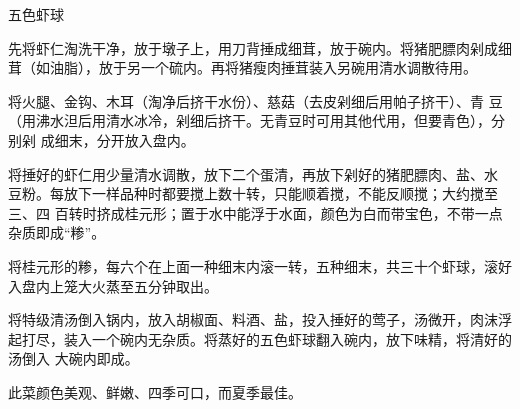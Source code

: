 \begin{recipe}{五色虾球}

\ingredients


\preparation

\step 先将虾仁淘洗干净，放于墩子上，用刀背捶成细茸，放于碗内。将猪肥膘肉剁成细
茸（如油脂），放于另一个硫内。再将猪瘦肉捶茸装入另碗用清水调散待用。

\step 将火腿、金钩、木耳（淘净后挤干水份）、慈菇（去皮剁细后用帕子挤干）、青
豆（用沸水泹后用清水冰冷，剁细后挤干。无青豆时可用其他代用，但要青色），分别剁
成细末，分开放入盘内。

\step 将捶好的虾仁用少量清水调散，放下二个蛋清，再放下剁好的猪肥膘肉、盐、水
豆粉。每放下一样品种时都要搅上数十转，只能顺着搅，不能反顺搅；大约搅至三、四
百转时挤成桂元形；置于水中能浮于水面，颜色为白而带宝色，不带一点杂质即成“糁”。

\step 将桂元形的糁，每六个在上面一种细末内滚一转，五种细末，共三十个虾球，滚好
入盘内上笼大火蒸至五分钟取出。

\step 将特级清汤倒入锅内，放入胡椒面、料酒、盐，投入捶好的莺子，汤微开，肉沫浮
起打尽，装入一个碗内无杂质。将蒸好的五色虾球翻入碗内，放下味精，将清好的汤倒入
大碗内即成。

\features

此菜颜色美观、鲜嫩、四季可口，而夏季最佳。

\end{recipe}

